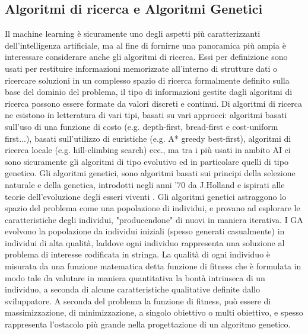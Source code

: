 \subsection{Algoritmi di ricerca e Algoritmi Genetici}
Il machine learning è sicuramente uno degli aspetti più caratterizzanti dell'intelligenza artificiale, ma al fine di fornirne una panoramica più ampia è interessare considerare anche gli algoritmi di ricerca. Essi per definizione sono usati per restituire informazioni memorizzate all'interno di strutture dati o ricercare soluzioni in un complesso spazio di ricerca formalmente definito sulla base del dominio del problema, il tipo di informazioni gestite dagli algoritmi di ricerca possono essere formate da valori discreti e continui. Di algoritmi di ricerca ne esistono in letteratura di vari tipi, basati su vari approcci: algoritmi basati sull'uso di una funzione di costo (e.g. depth-first, bread-first e cost-uniform first...), basati sull'utilizzo di euristiche (e.g. A* greedy best-first), algoritmi di ricerca locale (e.g. hill-climbing search) ecc., ma tra i più usati in ambito AI ci sono sicuramente gli algoritmi di tipo evolutivo ed in particolare quelli di tipo genetico. Gli algoritmi genetici, sono algoritmi basati sui principi della selezione naturale e della genetica, introdotti negli anni '70  da J.Holland e ispirati alle teorie dell'evoluzione degli esseri viventi \cite{geneticalgotihm}. Gli algoritmi genetici astraggono lo spazio del problema come una popolazione di individui, e provano ad esplorare le caratteristiche degli individui, "producendone" di nuovi in maniera iterativa. I GA evolvono la popolazione da individui iniziali (spesso generati casualmente) in individui di alta qualità, laddove ogni individuo rappresenta una soluzione al problema di interesse codificata in stringa. La qualità di ogni individuo è misurata da una funzione matematica detta funzione di fitness che è formulata in modo tale da valutare in maniera quantitativa la bontà intrinseca di un individuo, a seconda di alcune caratteristiche qualitative definite dallo sviluppatore. A seconda del problema la funzione di fitness, può essere di massimizzazione, di minimizzazione, a singolo obiettivo o multi obiettivo, e spesso rappresenta l'ostacolo più grande nella progettazione di un algoritmo genetico. \\

